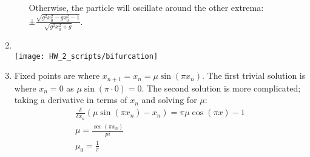 \documentclass[12pt]{article}
\begin{document}
\begin{enumerate}
\begin{enumerate}
      Otherwise, the particle will oscillate around the other extrema: $\pm\frac{\sqrt{g^2 x_0^2-gx_0^2-1}}{\sqrt{g^2 x_0^2+g}}$.
    \end{enumerate}
    \item\\
    
    \texttt{[image: HW\_2\_scripts/bifurcation]}
    \item
    Fixed points are where $x_{n+1}=x_n=\mu\sin\left(\pi x_n\right)$.
    The first trivial solution is where $x_n=0$ as $\mu\sin\left(\pi\cdot0\right)=0$.
    The second solution is more complicated;
    taking a derivative in terms of $x_n$ and solving for $\mu$:
    \begin{gather*}
      \frac{\delta}{\delta x_n}\left(\mu\sin\left(\pi x_n\right)-x_n\right)=\pi\mu\cos(\pi x)-1\\
      \mu=\frac{\sec(\pi x_n)}{pi}\\
      \mu_0=\frac{1}{\pi}
    \end{gather*}
  \end{enumerate}
\end{document}
